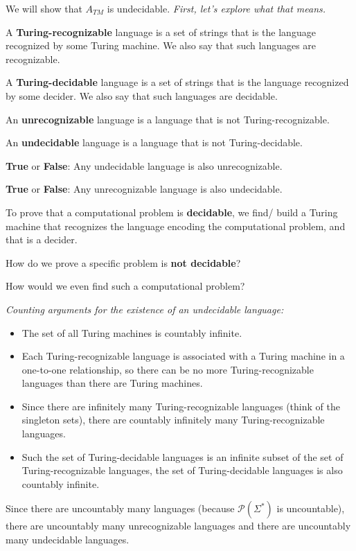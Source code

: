\documentclass[12pt, oneside]{article}
\begin{document}
We will show that $A_{TM}$ is undecidable.   {\it First, let's explore what that means.}

\newpage

A {\bf Turing-recognizable} language is a set of strings that 
is the language recognized by some Turing machine. We also 
say that such languages are recognizable.

A {\bf Turing-decidable} language is a set of strings that 
is the language recognized by some decider. We also 
say that such languages are decidable.

An {\bf unrecognizable} language is a language that is not Turing-recognizable.

An {\bf undecidable} language is a language that is not Turing-decidable.


{\bf  True} or {\bf False}: Any  undecidable language  is  also  unrecognizable.


{\bf  True} or {\bf False}: Any  unrecognizable language  is  also  undecidable.


To prove that a computational problem is {\bf decidable}, we find/ build a Turing 
machine that recognizes the language encoding the computational problem, and that 
is a decider.


How do we prove a specific problem is {\bf not decidable}?

How would we even find such a computational problem?


{\it Counting arguments for the existence of an undecidable language:}
\begin{itemize}
    \item The set of all Turing machines is countably infinite.
    \item Each Turing-recognizable language is associated with a Turing machine
    in a one-to-one relationship, so there can be no more Turing-recognizable
    languages than there are Turing machines. 
    \item Since there are infinitely many Turing-recognizable languages
    (think of the singleton sets), there are countably infinitely 
    many Turing-recognizable languages.
    \item Such the set of Turing-decidable languages is an infinite subset 
    of the set of Turing-recognizable languages, the set of 
    Turing-decidable languages is also countably infinite.
\end{itemize}

Since there are uncountably many languages (because $\mathcal{P}(\Sigma^*)$
is uncountable), there are uncountably many unrecognizable languages
and there are uncountably many undecidable languages.
\end{document}
